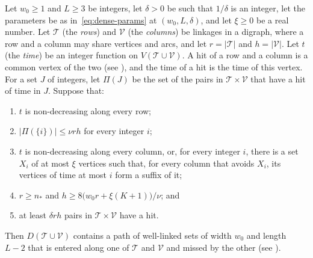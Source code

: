 \documentclass[fontsize=12pt,leading=14pt]{fullpaper}
\newcommand{\Tcal}{\mathcal{T}}
\newcommand{\Vcal}{\mathcal{V}}
\begin{document}
\begin{theorem}\label{thm:density}
  Let $w_0\ge1$ and $L\ge3$ be integers, let $\delta>0$ be such that $1/\delta$ is an integer, let the parameters be as in~\eqref{eq:dense-params} at $(w_0,L,\delta)$, and let $\xi\ge0$ be a real number.
  Let $\Tcal$ (the \emph{rows}) and $\Vcal$ (the \emph{columns}) be linkages in a digraph, where a row and a column may share vertices and arcs, and let $r=|\Tcal|$ and $h=|\Vcal|$.
  Let $t$ (the \emph{time}) be an integer function on $V(\Tcal\cup\Vcal)$.
  A hit of a row and a column is a common vertex of the two (see ), and the time of a hit is the time of this vertex.
  For a set $J$ of integers, let $\Pi(J)$ be the set of the pairs in $\Tcal\times\Vcal$ that have a hit of time in $J$.
  Suppose that:
  \begin{enumerate}[label=\textnormal{(G\arabic*)}]
    \item\label{item:density-G1} $t$ is non-decreasing along every row;
    \item\label{item:density-G2} $|\Pi(\{i\})|\le\nu rh$ for every integer $i$;
    \item\label{item:density-G3} $t$ is non-decreasing along every column, or, for every integer $i$, there is a set $X_i$ of at most $\xi$ vertices such that, for every column that avoids $X_i$, its vertices of time at most $i$ form a suffix of it;
    \item\label{item:density-G4} $r\ge n_*$ and $h\ge8\bigl(w_0r+\xi(K+1)\bigr)/\nu$; and
    \item\label{item:density-G5} at least $\delta rh$ pairs in $\Tcal\times\Vcal$ have a hit.
  \end{enumerate}
  Then $D(\Tcal\cup\Vcal)$ contains a path of well-linked sets of width $w_0$ and length $L-2$ that is entered along one of $\Tcal$ and $\Vcal$ and missed by the other (see ).
\end{theorem}
\end{document}
